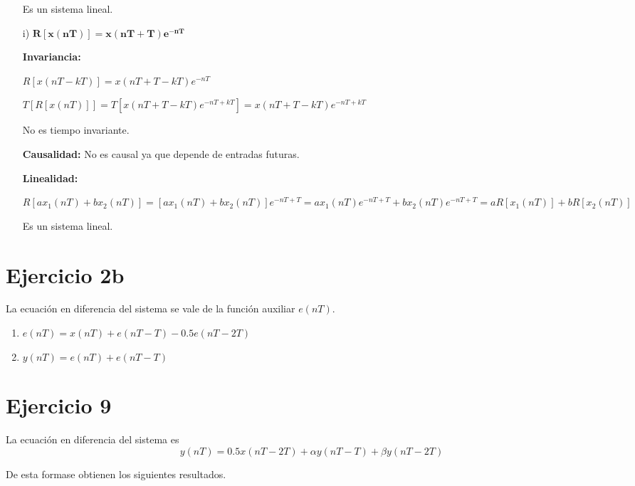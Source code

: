 \begin{itemize}
		Es un sistema lineal.
		
	\item[i)] $\mathbf{R \left[ x \left( nT \right) \right] = x \left( nT + T\right) e^{-nT}}$ 
	
		\textbf{Invariancia:}
		
		$R \left[ x \left( nT - kT \right) \right] =  x \left( nT + T - kT  \right) e^{-nT}$ 
		
		$T \left[ R \left[ x \left( nT \right) \right] \right] = T \left[  x \left( nT + T - kT \right) e^{-nT + kT} \right] = x \left( nT + T -kT \right) e^{-nT + kT}$ 
		
		No es tiempo invariante.
		
		\textbf{Causalidad:} No es causal ya que depende de entradas futuras.
		
		\textbf{Linealidad:}
		
		 $R \left[ ax_1 \left( nT \right) + bx_2 \left( nT \right) \right] = \left[ a x_{1} \left( nT \right) + b x_{2} \left( nT \right) \right] e^{-nT + T} = a x_{1} \left( nT \right) e^{-nT + T} + b x_{2} \left( nT \right) e^{-nT + T} = aR \left[ x_1 \left( nT \right) \right] + bR \left[ x_2 \left( nT \right) \right]$

		Es un sistema lineal.		

\end{itemize}

\section*{Ejercicio 2b}
La ecuación en diferencia del sistema se vale de la función auxiliar $e(nT)$.

\begin{enumerate}
	\item	$e(nT) = x(nT) + e(nT - T) - 0.5e(nT - 2T)$
	\item	$y(nT) = e(nT) + e(nT - T)$
\end{enumerate}

\section*{Ejercicio 9}
La ecuación en diferencia del sistema es
\begin{equation*}
	y(nT) = 0.5x(nT - 2T) + \alpha y(nT - T) + \beta y(nT - 2T)
\end{equation*}

De esta formase obtienen los siguientes resultados.

